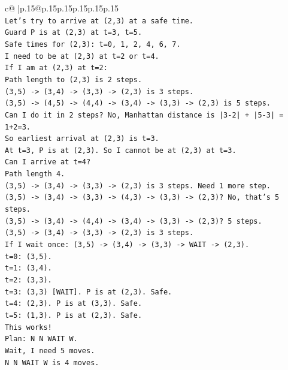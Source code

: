 \documentclass{article}
\begin{document}
{\begin{supertabular}{c@{$\;$}|p{.15\linewidth}@{}p{.15\linewidth}p{.15\linewidth}p{.15\linewidth}p{.15\linewidth}p{.15\linewidth}}
{{{\\ 
\texttt{Let's try to arrive at (2,3) at a safe time.} \\
\texttt{Guard P is at (2,3) at t=3, t=5.} \\
\texttt{Safe times for (2,3): t=0, 1, 2, 4, 6, 7.} \\
\texttt{I need to be at (2,3) at t=2 or t=4.} \\
\texttt{If I am at (2,3) at t=2:} \\
\texttt{Path length to (2,3) is 2 steps.} \\
\texttt{(3,5) {-}> (3,4) {-}> (3,3) {-}> (2,3) is 3 steps.} \\
\texttt{(3,5) {-}> (4,5) {-}> (4,4) {-}> (3,4) {-}> (3,3) {-}> (2,3) is 5 steps.} \\
\texttt{Can I do it in 2 steps? No, Manhattan distance is |3{-}2| + |5{-}3| = 1+2=3.} \\
\texttt{So earliest arrival at (2,3) is t=3.} \\
\texttt{At t=3, P is at (2,3). So I cannot be at (2,3) at t=3.} \\
\texttt{Can I arrive at t=4?} \\
\texttt{Path length 4.} \\
\texttt{(3,5) {-}> (3,4) {-}> (3,3) {-}> (2,3) is 3 steps. Need 1 more step.} \\
\texttt{(3,5) {-}> (3,4) {-}> (3,3) {-}> (4,3) {-}> (3,3) {-}> (2,3)? No, that's 5 steps.} \\
\texttt{(3,5) {-}> (3,4) {-}> (4,4) {-}> (3,4) {-}> (3,3) {-}> (2,3)? 5 steps.} \\
\texttt{(3,5) {-}> (3,4) {-}> (3,3) {-}> (2,3) is 3 steps.} \\
\texttt{If I wait once: (3,5) {-}> (3,4) {-}> (3,3) {-}> WAIT {-}> (2,3).} \\
\texttt{t=0: (3,5).} \\
\texttt{t=1: (3,4).} \\
\texttt{t=2: (3,3).} \\
\texttt{t=3: (3,3) {[}WAIT{]}. P is at (2,3). Safe.} \\
\texttt{t=4: (2,3). P is at (3,3). Safe.} \\
\texttt{t=5: (1,3). P is at (2,3). Safe.} \\
\texttt{This works!} \\
\texttt{Plan: N N WAIT W.} \\
\texttt{Wait, I need 5 moves.} \\
\texttt{N N WAIT W is 4 moves.} \\
}}}
\end{supertabular}}
\end{document}
